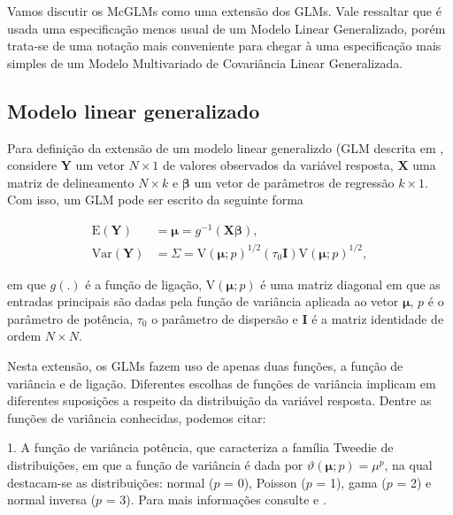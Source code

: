 Vamos discutir os McGLMs como uma extensão dos GLMs. Vale ressaltar que é usada uma especificação menos usual de um Modelo Linear Generalizado, porém trata-se de uma notação mais conveniente para chegar à uma especificação mais simples de um Modelo Multivariado de Covariância Linear Generalizada.

\subsection{Modelo linear generalizado}

Para definição da extensão de um modelo linear generalizdo (GLM descrita em \citet{Bonat16}, considere $\boldsymbol{Y}$ um vetor $N \times 1$ de valores observados da variável resposta, $\boldsymbol{X}$ uma matriz de delineamento $N \times k$ e $\boldsymbol{\beta}$ um vetor de parâmetros de regressão $k \times 1$. Com isso, um GLM pode ser escrito da seguinte forma 

\begin{equation}
\label{eq:glm}
      \begin{aligned}
        \mathrm{E}(\boldsymbol{Y}) &=
         \boldsymbol{\mu} =
            g^{-1}(\boldsymbol{X} \boldsymbol{\beta}),
            \\
        \mathrm{Var}(\boldsymbol{Y}) &=
          \Sigma =
          \mathrm{V}\left(\boldsymbol{\mu}; p\right)^{1/2}\left(\tau_0\boldsymbol{I}\right)\mathrm{V}\left(\boldsymbol{\mu}; p\right)^{1/2},
      \end{aligned}
\end{equation}

\noindent em que $g(.)$ é a função de ligação, $\mathrm{V}\left(\boldsymbol{\mu}; p\right)$ é uma matriz diagonal em que as entradas principais são dadas pela função de variância aplicada ao vetor $\boldsymbol{\mu}$, $p$ é o parâmetro de potência, $\tau_0$ o parâmetro de dispersão e $\boldsymbol{I}$ é a matriz identidade de ordem $N\times N$.

Nesta extensão, os GLMs fazem uso de apenas duas funções, a função de variância e de ligação. Diferentes escolhas de funções de variância implicam em diferentes suposições a respeito da distribuição da variável resposta. Dentre as funções de variância conhecidas, podemos citar:

1. A função de variância potência, que caracteriza a família Tweedie de distribuições, em que a função de variância é dada por $\vartheta\left(\boldsymbol{\mu}; p\right) = \mu^p$, na qual destacam-se as distribuições: normal ($p$ = 0), Poisson ($p$ = 1), gama ($p$ = 2) e  normal inversa ($p$ = 3). Para mais informações consulte \citet{Jorgensen87} e \citet{Jorgensen97}.

